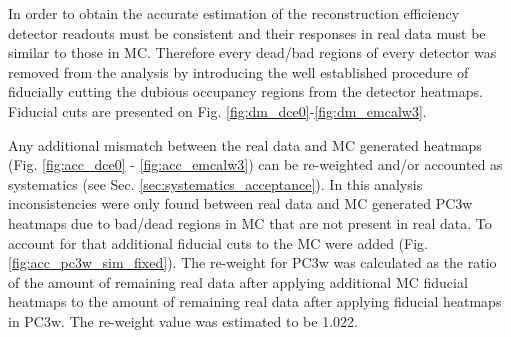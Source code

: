 In order to obtain the accurate estimation of the reconstruction efficiency detector readouts must be consistent and their responses in real data must be similar to those in MC. Therefore every dead/bad regions of every detector was removed from the analysis by introducing the well established procedure of fiducially cutting the dubious occupancy regions from the detector heatmaps. Fiducial cuts are presented on Fig. \ref{fig:dm_dce0}-\ref{fig:dm_emcalw3}.

Any additional mismatch between the real data and MC generated heatmaps (Fig. \ref{fig:acc_dce0} - \ref{fig:acc_emcalw3}) can be re-weighted and/or accounted as systematics (see Sec. \ref{sec:systematics_acceptance}). In this analysis inconsistencies were only found between real data and MC generated PC3w heatmaps due to bad/dead regions in MC that are not present in real data. To account for that additional fiducial cuts to the MC were added (Fig. \ref{fig:acc_pc3w_sim_fixed}). The re-weight for PC3w was calculated as the ratio of the amount of remaining real data after applying additional MC fiducial heatmaps to the amount of remaining real data after applying fiducial heatmaps in PC3w. The re-weight value was estimated to be 1.022.

